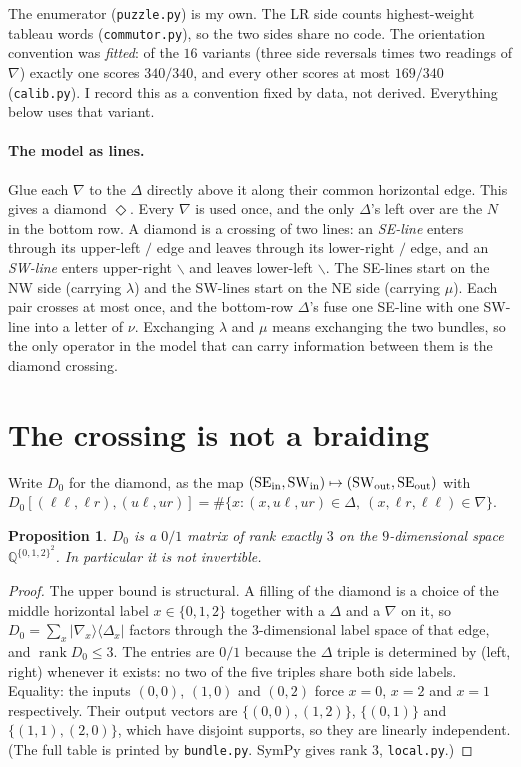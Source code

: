\documentclass[11pt]{article}
\newtheorem{proposition}[theorem]{Proposition}
\theoremstyle{definition}
\theoremstyle{remark}
\begin{document}
\noindent The enumerator (\texttt{puzzle.py}) is my own. The LR side counts
highest-weight tableau words (\texttt{commutor.py}), so the two sides share no code.
The orientation convention was \emph{fitted}: of the $16$ variants (three side
reversals times two readings of $\nabla$) exactly one scores $340/340$, and every other
scores at most $169/340$ (\texttt{calib.py}). I record this as a convention fixed by
data, not derived. Everything below uses that variant.

\paragraph{The model as lines.} Glue each $\nabla$ to the $\Delta$ directly above it
along their common horizontal edge. This gives a diamond $\Diamond$. Every $\nabla$ is
used once, and the only $\Delta$'s left over are the $N$ in the bottom row. A diamond is a
crossing of two lines: an \emph{SE-line} enters through its upper-left $/$ edge and
leaves through its lower-right $/$ edge, and an \emph{SW-line} enters upper-right
$\backslash$ and leaves lower-left $\backslash$. The SE-lines start on the NW side
(carrying $\lambda$) and the SW-lines start on the NE side (carrying $\mu$). Each pair
crosses at most once, and the bottom-row $\Delta$'s fuse one SE-line with one SW-line
into a letter of $\nu$. Exchanging $\lambda$ and $\mu$ means exchanging the two bundles,
so the only operator in the model that can carry information between them is the
diamond crossing.

\section{The crossing is not a braiding}

Write $D_0$ for the diamond, as the map
$(\text{SE}_{\rm in},\text{SW}_{\rm in})\mapsto(\text{SW}_{\rm out},\text{SE}_{\rm out})$
with $D_0[(\ell\ell,\ell r),(u\ell,ur)]=\#\{x:(x,u\ell,ur)\in\Delta,\ (x,\ell r,\ell\ell)\in\nabla\}$.

\begin{proposition}\label{prop:rank}
$D_0$ is a $0/1$ matrix of rank exactly $3$ on the $9$-dimensional space
$\mathbb{Q}^{\{0,1,2\}^2}$. In particular it is not invertible.
\end{proposition}
\begin{proof}
The upper bound is structural. A filling of the diamond is a choice of the middle
horizontal label $x\in\{0,1,2\}$ together with a $\Delta$ and a $\nabla$ on it, so
$D_0=\sum_x |\nabla_x\rangle\langle\Delta_x|$ factors through the $3$-dimensional label
space of that edge, and $\operatorname{rank}D_0\le3$. The entries are $0/1$ because the
$\Delta$ triple is determined by (left, right) whenever it exists: no two of the five
triples share both side labels. Equality: the inputs $(0,0)$, $(1,0)$ and $(0,2)$
force $x=0$, $x=2$ and $x=1$ respectively. Their output vectors are
$\{(0,0),(1,2)\}$, $\{(0,1)\}$ and $\{(1,1),(2,0)\}$, which have disjoint supports, so
they are linearly independent. (The full table is printed by \texttt{bundle.py}. SymPy
gives rank $3$, \texttt{local.py}.)
\end{proof}
\end{document}
